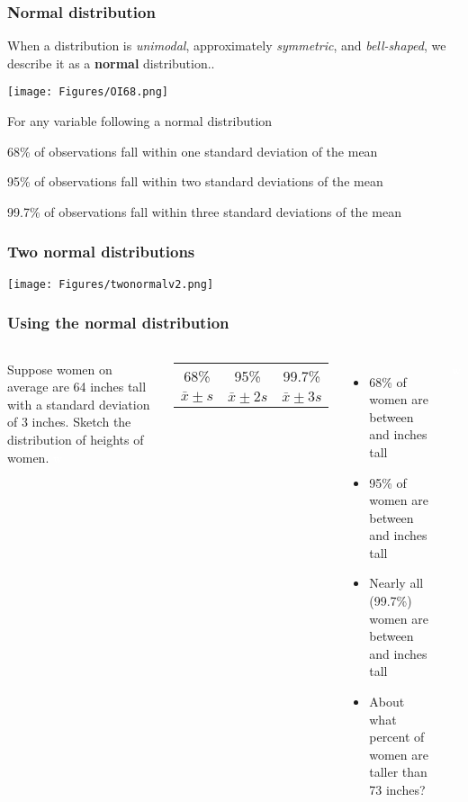 \begin{frame}
\frametitle{Normal distribution}
When a distribution is \emph{unimodal}, approximately \emph{symmetric}, and \emph{bell-shaped}, we describe it as a \textbf{normal} distribution..
\begin{center}
\texttt{[image: Figures/OI68.png]}
\end{center}
For any variable following a normal distribution
\begin{itemize}
    \small{
    \item
    68\% of observations fall within one standard deviation of the mean
    \item
    95\% of observations fall within two standard deviations of the mean
    \item
    99.7\% of observations fall within three standard deviations of the mean}
\end{itemize}
\end{frame}

\begin{frame}
\frametitle{Two normal distributions}
\begin{center}
\texttt{[image: Figures/twonormalv2.png]}
\end{center}
\end{frame}


\begin{frame}
\frametitle{Using the normal distribution}
\begin{columns}
Suppose women on average are 64 inches tall with a standard deviation of 3 inches.  
Sketch the distribution of heights of women.
\vskip100pt
\textcolor{white}{w}
\begin{center}
\begin{tabular}{|ccc|}
    \hline
    68\% & 95\% & 99.7\% \\
    $\bar{x}\pm s$ & $\bar{x}\pm 2s$ & $\bar{x}\pm 3s$\\
    \hline
\end{tabular}
\end{center}
\begin{itemize}
    \item
    68\% of women are between \bs and \bs inches tall
    \item
    95\% of women are between \bs and \bs inches tall
    \item
    Nearly all (99.7\%) women are between \bs and \bs inches tall
    \item
    About what percent of women are taller than 73 inches?\\
\end{itemize}
\vskip100pt
\textcolor{white}{w}
\end{columns}
\end{frame}

